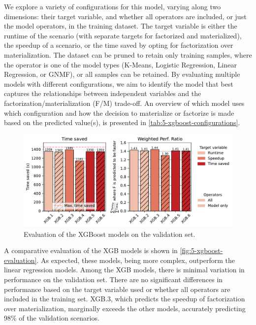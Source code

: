 We explore a variety of configurations for this model, varying along two dimensions: their target variable, and whether all operators are included, or just the model operators, in the training dataset. The target variable is either the runtime of the scenario (with separate targets for factorized and materialized), the speedup of a scenario, or the time saved by opting for factorization over materialization. The dataset can be pruned to retain only training samples, where the operator is one of the model types (K-Means, Logistic Regression, Linear Regression, or GNMF), or all samples can be retained. By evaluating multiple models with different configurations, we aim to identify the model that best captures the relationships between independent variables and the factorization/materialization (F/M) trade-off. An overview of which model uses which configuration and how the decision to materialize or factorize is made based on the predicted value(s), is presented in \autoref{tab:5-xgboost-configurations}.

\begin{figure}[ht]
  \centering
  \includegraphics[width=\linewidth]{chapters/05_cost_estimation/figures/xgb-models-compare.pdf}
  \caption[XGBoost model Comparison]{Evaluation of the XGBoost models on the validation set.}
  \label{fig:5-xgboost-evaluation}
\end{figure}

A comparative evaluation of the XGB models is shown in \autoref{fig:5-xgboost-evaluation}. As expected, these models, being more complex, outperform the linear regression models. Among the XGB models, there is minimal variation in performance on the validation set. There are no significant differences in performance based on the target variable used or whether all operators are included in the training set. XGB.3, which predicts the speedup of factorization over materialization, marginally exceeds the other models, accurately predicting 98\% of the validation scenarios.

